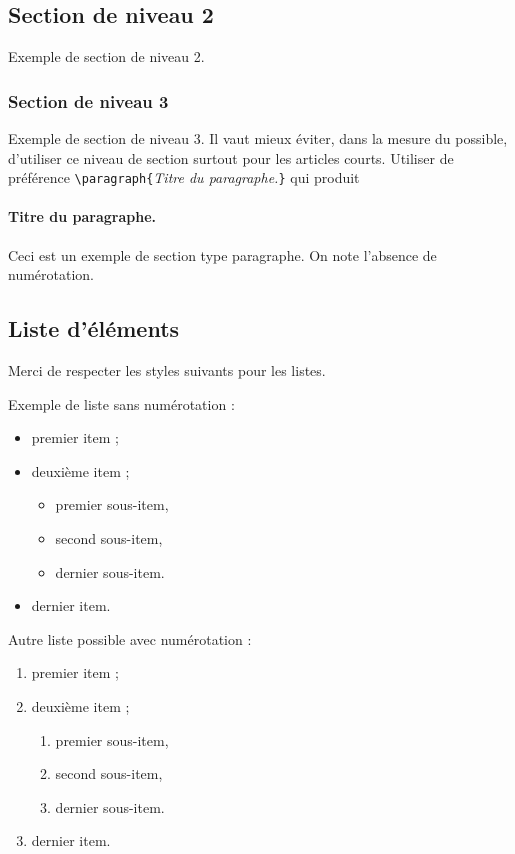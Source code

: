 \documentclass[a4paper,french]{rnti}
\begin{document}
\subsection{Section de niveau 2}

Exemple de section de niveau 2.


\subsubsection{Section de niveau 3}

Exemple de section de niveau 3. Il vaut mieux éviter, dans la mesure
du possible, d'utiliser ce niveau de section surtout pour les
articles courts. Utiliser de préférence
\verb+\paragraph{+\textit{Titre du paragraphe.}\verb+}+ qui produit

\paragraph{Titre du paragraphe.} Ceci est un exemple de section type
paragraphe. On note l'absence de numérotation.

\subsection{Liste d'éléments}

Merci de respecter les styles suivants pour les listes.

Exemple de liste sans numérotation :
\begin{itemize}
    \item premier item ;
    \item deuxième item ;
    \begin{itemize}
      \item premier sous-item,
      \item second sous-item,
      \item dernier sous-item.
  \end{itemize}
  \item dernier item.
\end{itemize}

Autre liste possible avec numérotation :
\begin{enumerate}
    \item premier item ;
    \item deuxième item ;
    \begin{enumerate}
      \item premier sous-item,
      \item second sous-item,
      \item dernier sous-item.
    \end{enumerate}
  \item dernier item.
\end{enumerate}
\end{document}
